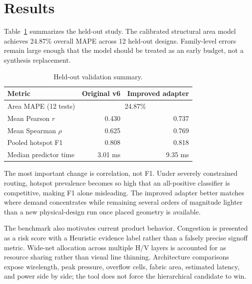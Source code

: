 \section{Results}
Table~\ref{tab:results} summarizes the held-out study. The calibrated structural area model achieves 24.87\% overall MAPE across 12 held-out designs. Family-level errors remain large enough that the model should be treated as an early budget, not a synthesis replacement.

\begin{table}[h]
\centering
\caption{Held-out validation summary.}
\label{tab:results}
\begin{tabular}{lrr}
\toprule
Metric & Original v6 & Improved adapter \\
\midrule
Area MAPE (12 tests) & \multicolumn{2}{c}{24.87\%} \\
Mean Pearson $r$ & 0.430 & 0.737 \\
Mean Spearman $\rho$ & 0.625 & 0.769 \\
Pooled hotspot F1 & 0.808 & 0.818 \\
Median predictor time & 3.01 ms & 9.35 ms \\
\bottomrule
\end{tabular}
\end{table}

The most important change is correlation, not F1. Under severely constrained routing, hotspot prevalence becomes so high that an all-positive classifier is competitive, making F1 alone misleading. The improved adapter better matches where demand concentrates while remaining several orders of magnitude lighter than a new physical-design run once placed geometry is available.

The benchmark also motivates current product behavior. Congestion is presented as a risk score with a Heuristic evidence label rather than a falsely precise signoff metric. Wide-net allocation across multiple H/V layers is accounted for as resource sharing rather than visual line thinning. Architecture comparisons expose wirelength, peak pressure, overflow cells, fabric area, estimated latency, and power side by side; the tool does not force the hierarchical candidate to win.
